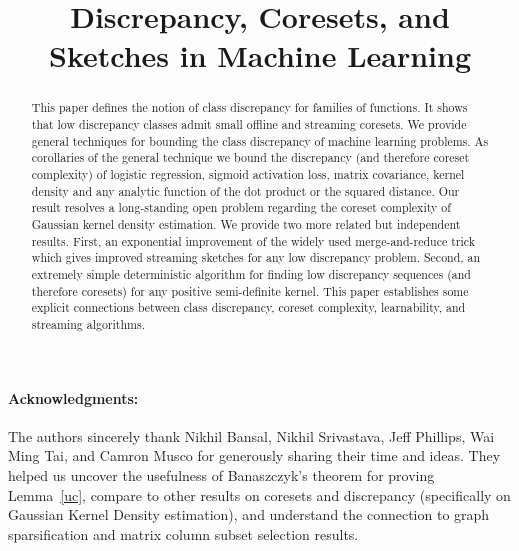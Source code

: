 \documentclass[12pt]{colt2019} %
\title[Discrepancy, Coresets, and Sketches in Machine Learning]{Discrepancy, Coresets, and Sketches in Machine Learning}
\begin{document}
\maketitle

\begin{abstract}
This paper defines the notion of class discrepancy for families of functions.  
It shows that low discrepancy classes admit small offline and streaming coresets. 
We provide general techniques for bounding the class discrepancy of machine learning problems. 
As corollaries of the general technique we bound the discrepancy (and therefore coreset complexity) of logistic regression, sigmoid activation loss, matrix covariance, kernel density and any analytic function of the dot product or the squared distance.
Our result resolves a long-standing open problem regarding the coreset complexity of Gaussian kernel density estimation.  
We provide two more related but independent results. 
First, an exponential improvement of the widely used merge-and-reduce trick which gives improved streaming sketches for any low discrepancy problem.
Second, an extremely simple deterministic algorithm for finding low discrepancy sequences (and therefore coresets) for any positive semi-definite kernel. 
This paper establishes some explicit connections between class discrepancy, coreset complexity, learnability, and streaming algorithms. 
\end{abstract}

\paragraph{Acknowledgments:} The authors sincerely thank Nikhil Bansal, Nikhil Srivastava, Jeff Phillips, Wai Ming Tai, and Camron Musco 
for generously sharing their time and ideas.
They helped us uncover the usefulness of Banaszczyk's theorem for proving Lemma~\ref{uc}, compare to other results on coresets and discrepancy
(specifically on Gaussian Kernel Density estimation), and understand the connection to graph sparsification and matrix column subset selection results. 
\end{document}
